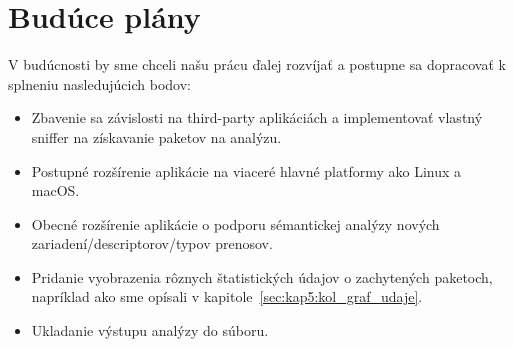 \section{Budúce plány}
V budúcnosti by sme chceli našu prácu ďalej rozvíjať a postupne sa dopracovať k splneniu nasledujúcich bodov:
\begin{itemize}
\item Zbavenie sa závislosti na third-party aplikáciách a implementovať vlastný sniffer na získavanie paketov na analýzu.
\item Postupné rozšírenie aplikácie na viaceré hlavné platformy ako Linux a macOS.
\item Obecné rozšírenie aplikácie o podporu sémantickej analýzy nových zariadení/descriptorov/typov prenosov.
\item Pridanie vyobrazenia rôznych štatistických údajov o zachytených paketoch, napríklad ako sme opísali v kapitole~\ref{sec:kap5:kol_graf_udaje}.
\item Ukladanie výstupu analýzy do súboru.
\end{itemize}



































